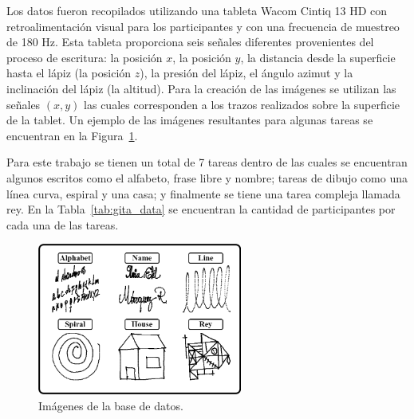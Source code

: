 \documentclass[10pt, a4paper]{article}
\begin{document}
Los datos fueron recopilados utilizando una tableta Wacom Cintiq 13 HD con retroalimentación visual 
para los participantes y con una frecuencia de muestreo de 180 Hz. Esta tableta proporciona seis 
señales diferentes provenientes del proceso de escritura: la posición $x$, la posición $y$, la distancia 
desde la superficie hasta el lápiz (la posición $z$), la presión del lápiz, el ángulo azimut y la 
inclinación del lápiz (la altitud). Para la creación de las imágenes se utilizan las señales $(x,y)$
las cuales corresponden a los trazos realizados sobre la superficie de la tablet. Un ejemplo de las
imágenes resultantes para algunas tareas se encuentran en la Figura~\ref*{fig:db_images}.

Para este trabajo se tienen un total de 7 tareas dentro de las cuales se encuentran algunos escritos 
como el alfabeto, frase libre y nombre; tareas de dibujo como una línea curva, espiral y una casa; y 
finalmente se tiene una tarea compleja llamada rey. En la Tabla~\ref{tab:gita_data} se encuentran 
la cantidad de participantes por cada una de las tareas. 


\begin{figure}
    \centering
    \includegraphics[width=0.6\textwidth]{images/HW_Tasks.png}
    \caption{Imágenes de la base de datos.}
    \label{fig:db_images}
\end{figure}
\end{document}

